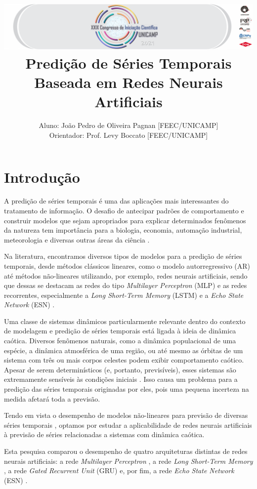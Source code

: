 \documentclass[10pt, technote]{article}
\title{{\noindent \includegraphics[scale = 0.5]{banner-grande.png}}\\ Predição de Séries Temporais Baseada em Redes Neurais
Artificiais}
\author{Aluno: João Pedro de Oliveira Pagnan [FEEC/UNICAMP]\\Orientador: Prof.  Levy Boccato [FEEC/UNICAMP]}
\begin{document}

\section{Introdução}

A predição de séries temporais é uma das aplicações mais interessantes do tratamento de informação. O desafio de antecipar padrões de comportamento e construir modelos que sejam apropriados para explicar determinados fenômenos da natureza tem importância  para a biologia, economia, automação industrial, meteorologia e diversas outras áreas da ciência \cite{box2015time}.

Na literatura, encontramos diversos tipos de modelos para a  predição de séries temporais, desde métodos clássicos lineares, como o modelo autorregressivo (AR) \cite{box2015time} até métodos não-lineares utilizando, por exemplo, redes neurais artificiais, sendo que dessas se destacam as redes do tipo \textit{Multilayer Perceptron} (MLP) \cite{rosenblatt1958perceptron} e as redes recorrentes, especialmente a \textit{Long Short-Term Memory} (LSTM)  \cite{connor1994recurrent} e a \textit{Echo State Network} (ESN) \cite{jaeger2007echo}.

Uma classe de sistemas dinâmicos particularmente relevante dentro do contexto de modelagem e predição de séries temporais está ligada à ideia de dinâmica caótica. Diversos fenômenos naturais, como a dinâmica populacional de uma espécie, a dinâmica atmosférica de uma região, ou até mesmo as órbitas de um sistema com três ou mais corpos celestes podem exibir comportamento caótico. Apesar de serem determinísticos (e, portanto, previsíveis), esses sistemas são extremamente sensíveis às condições iniciais \cite{fiedler1994caos}. Isso causa um problema para a predição das séries temporais originadas por eles, pois uma pequena incerteza na medida afetará toda a previsão. 

Tendo em vista o desempenho de modelos não-lineares para previsão de diversas séries temporais \cite{connor1994recurrent}, optamos por estudar a aplicabilidade de redes neurais artificiais à previsão de séries relacionadas a sistemas com dinâmica caótica.

Esta pesquisa comparou o desempenho de quatro arquiteturas distintas de redes neurais artificiais: a rede \textit{Multilayer Perceptron} \cite{rosenblatt1958perceptron}, a rede \textit{Long Short-Term Memory} \cite{connor1994recurrent}, a rede \textit{Gated Recurrent Unit} (GRU) \cite{cho2014learning} e, por fim, a rede \textit{Echo State Network} (ESN) \cite{jaeger2007echo}.
\end{document}
